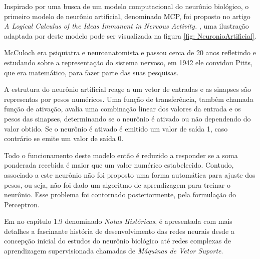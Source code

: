         Inspirado por uma busca de um modelo computacional do neurônio biológico, o primeiro modelo de neurônio artificial, denominado MCP, foi proposto no artigo \textit{ A Logical Calculus of the Ideas Immanent in Nervous Activity.} \cite{mcculloch43a}, uma ilustração adaptada por \cite{lemos} deste modelo pode ser visualizada na figura \ref{fig: NeuronioArtificial}.
        
        McCuloch era psiquiatra e neuroanatomista e passou cerca de 20 anos refletindo e estudando sobre a representação do sistema nervoso, em 1942 ele convidou Pitts, que era matemático, para fazer parte das suas pesquisas.
        
        A estrutura do neurônio artificial reage a um vetor de entradas e as sinapses são representas por pesos numéricos. Uma função de transferência, também chamada função de ativação, avalia uma combinação linear dos valores da entrada e os pesos das sinapses, determinando se o neurônio é ativado ou não dependendo do valor obtido. Se o neurônio é ativado é emitido um valor de saída 1, caso contrário se emite um valor de saída 0.
            \begin{figure}[ht]
            \end{figure}
            
        Todo o funcionamento deste modelo então é reduzido a responder se a soma ponderada recebida é maior que um valor numérico estabelecido. Contudo, associado a este neurônio não foi proposto uma forma automática para ajuste dos pesos, ou seja, não foi dado um algoritmo de aprendizagem para treinar o neurônio. Esse problema foi contornado posteriormente, pela formulação do Perceptron.
        
        Em  no capítulo 1.9 denominado \textit{Notas Históricas}, é apresentada com mais detalhes a fascinante história de desenvolvimento das redes neurais desde a concepção inicial do estudos do neurônio biológico até redes complexas de aprendizagem supervisionada chamadas de \textit{Máquinas de Vetor Suporte}.
            
